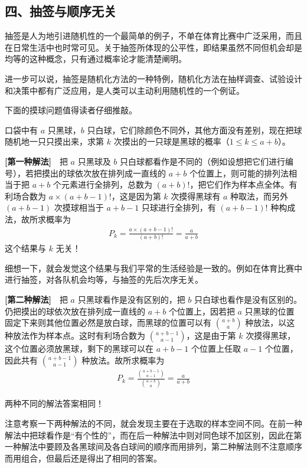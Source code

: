 \documentclass[../../main.tex]{subfiles}
\begin{document}
\subsection*{四、抽签与顺序无关}

抽签是人为地引进随机性的一个最简单的例子，不单在体育比赛中广泛采用，而且在日常生活中也时常可见。关于抽签所体现的公平性，即结果虽然不同但机会却是均等的这种概念，只有通过概率论才能清楚阐明。

进一步可以说，抽签是随机化方法的一种特例，随机化方法在抽样调查、试验设计和决策中都有广泛应用，是人类可以主动利用随机性的一个例证。

下面的摸球问题值得读者仔细推敲。

\begin{example}[抽签与顺序无关]\label{example:ch01-抽签}
口袋中有 $a$ 只黑球，$b$ 只白球，它们除颜色不同外，其他方面没有差别，现在把球随机地一只只摸出来，求第 $k$ 次摸出的一只球是黑球的概率（$1\leqslant k\leqslant a+b$）。

\textbf{[第一种解法]}~~把 $a$ 只黑球及 $b$ 只白球都看作是不同的（例如设想把它们进行编号），若把摸出的球依次放在排列成一直线的 $a+b$ 个位置上，则可能的排列法相当于把 $a+b$ 个元素进行全排列，总数为 $(a+b)!$，把它们作为样本点全体。有利场合数为 $a\times(a+b-1)!$，这是因为第 $k$ 次摸得黑球有 $a$ 种取法，而另外 $(a+b-1)$ 次摸球相当于 $a+b-1$ 只球进行全排列，有 $(a+b-1)!$ 种构成法，故所求概率为
\begin{align*}
P_k=\frac{a\times(a+b-1)!}{(a+b)!}=\frac{a}{a+b}
\end{align*}
这个结果与 $k$ 无关！

细想一下，就会发觉这个结果与我们平常的生活经验是一致的。例如在体育比赛中进行抽签，对各队机会均等，与抽签的先后次序无关。

\textbf{[第二种解法]}~~把 $a$ 只黑球看作是没有区别的，把 $b$ 只白球也看作是没有区别的。仍把摸出的球依次放在排列成一直线的 $a+b$ 个位置上，因若把 $a$ 只黑球的位置固定下来则其他位置必然是放白球，而黑球的位置可以有 $\binom{a+b}{a}$ 种放法，以这种放法作为样本点。这时有利场合数为 $\binom{a+b-1}{a-1}$，这是由于第 $k$ 次摸得黑球，这个位置必须放黑球，剩下的黑球可以在 $a+b-1$ 个位置上任取 $a-1$ 个位置，因此共有 $\binom{a+b-1}{a-1}$ 种放法。故所求概率为
\begin{align*}
P_k=\frac{\binom{a+b-1}{a-1}}{\binom{a+b}{a}}=\frac{a}{a+b}
\end{align*}

两种不同的解法答案相同！

注意考察一下两种解法的不同，就会发现主要在于选取的样本空间不同。在前一种解法中把球看作是“有个性的”，而在后一种解法中则对同色球不加区别，因此在第一种解法中要顾及各黑球间及各白球间的顺序而用排列，第二种解法则不注意顺序而用组合，但最后还是得出了相同的答案。


\end{example}
\end{document}

